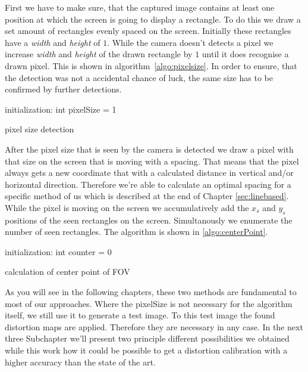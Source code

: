 \documentclass[journal,final,a4paper,twoside]{PS}
\begin{document}
 First we have to make sure, that the captured image contains at least one position at which the screen is going to display a rectangle. To do this we draw a set amount of rectangles evenly spaced on the screen. Initially these rectangles have a \emph{width} and \emph{height} of $1$. While the camera doesn't detects a pixel we increase \emph{width} and \emph{height} of the drawn rectangle by $1$ until it does recognise a drawn pixel. This is shown in algorithm~\ref{algo:pixelsize}. In order to ensure, that the detection was not a accidental chance of luck, the same size has to be confirmed by further detections. 
\begin{algorithm}[h]
 initialization: int pixelSize = 1\;
 \caption{pixel size detection}
 \label{algo:pixelsize}
\end{algorithm} 
 
 After the pixel size that is seen by the camera is detected we draw a pixel with that size on the screen that is moving with a spacing. That means that the pixel always gets a new coordinate that with a calculated distance in vertical and/or horizontal  direction. Therefore we're able to calculate an optimal spacing for a specific method of us which is described at the end of Chapter \ref{sec:linebased}. While the pixel is moving on the screen we accumulatively add the $x_s$ and $y_s$ positions of the seen rectangles on the screen. Simultanously we enumerate the number of seen rectangles. The algorithm is shown in \ref{algo:centerPoint}.
 
\begin{algorithm}[h]
 initialization: int counter = 0\;
 \caption{calculation of center point of FOV}
 \label{algo:centerPoint}
\end{algorithm} 

As you will see in the following chapters, these two methods are fundamental to most of our approaches. Where the pixelSize is not necessary for the algorithm itself, we still use it to generate a test image. To this test image the found distortion maps are applied. Therefore they are necessary in any case. In the next three Subchapter we'll present two principle different possibilities we obtained while this work how it could be possible to get a distortion calibration with a higher accuracy than the state of the art. 
 
\end{document}
